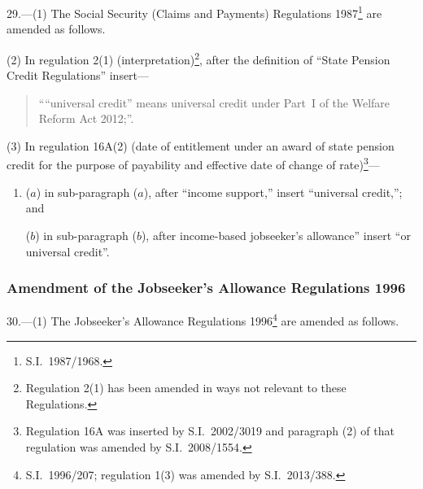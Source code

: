 \documentclass[12pt,a4paper]{article}
\begin{document}
29.—(1) The Social Security (Claims and Payments) Regulations 1987\footnote{S.I.~1987/1968.} are amended as follows.

(2) In regulation 2(1) (interpretation)\footnote{Regulation 2(1) has been amended in ways not relevant to these Regulations.}, after the definition of “State Pension Credit Regulations” insert—
\begin{quotation}
““universal credit” means universal credit under Part~I of the Welfare Reform Act 2012;”.
\end{quotation}

(3) In regulation 16A(2) (date of entitlement under an award of state pension credit for the purpose of payability and effective date of change of rate)\footnote{Regulation 16A was inserted by S.I.~2002/3019 and paragraph (2) of that regulation was amended by S.I.~2008/1554.}—
\begin{enumerate}\item[]
($a$) in sub-paragraph ($a$), after “income support,” insert “universal credit,”; and

($b$) in sub-paragraph ($b$), after income-based jobseeker’s allowance” insert “or universal credit”.
\end{enumerate}

\subsubsection[30. Amendment of the Jobseeker’s Allowance Regulations 1996]{Amendment of the Jobseeker’s Allowance Regulations 1996}

30.—(1) The Jobseeker’s Allowance Regulations 1996\footnote{S.I.~1996/207; regulation 1(3) was amended by S.I.~2013/388.} are amended as follows.
\end{document}
